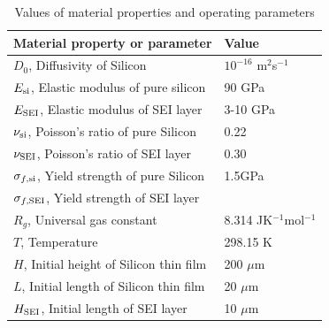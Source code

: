 \begin{table}[H]
\caption{Values of material properties and operating parameters}
\vspace{1em}
\begin{tabularx}{\textwidth}{Xl}
\hline
 {Material property or parameter} & {Value} \\
\hline
$D_0$, Diffusivity of Silicon & $10^{-16}$ m$^{2}$s$^{-1}$ \\
$E_{{\rm{si}}}$, Elastic modulus of pure silicon & 90 GPa \\
$E_{\rm{SEI}}$, Elastic modulus of SEI layer & 3-10 GPa \\
$\nu_{{\rm{si}}}$, Poisson's ratio of pure Silicon & 0.22\\
$\nu_{\rm{SEI}}$, Poisson's ratio of SEI layer & 0.30\\
$\sigma_{f,{\rm{si}}}$, Yield strength of pure Silicon & 1.5GPa\\
$\sigma_{f, {\rm{SEI}}}$, Yield strength of SEI layer & \\
$R_g$, Universal gas constant & 8.314 JK$^{-1}$mol$^{-1}$\\
$T$, Temperature & 298.15 K\\
$H$, Initial height of Silicon thin film & 200 $\mu$m\\
$L$, Initial length of Silicon thin film & 20 $\mu$m\\
$H_{\rm{SEI}}$, Initial length of SEI layer & 10 $\mu$m
\end{tabularx}
\end{table}

